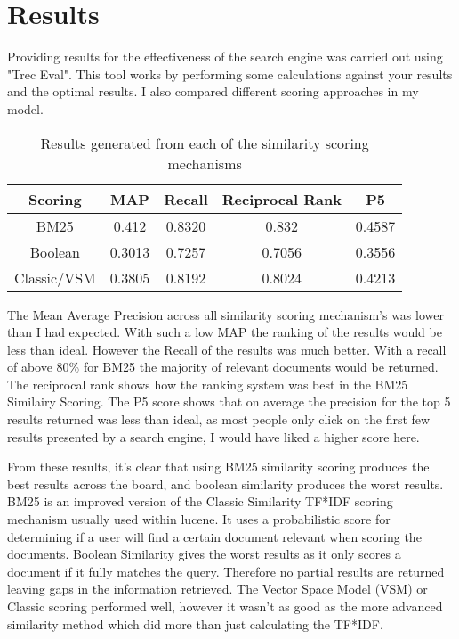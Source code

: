 \section{Results}
Providing results for the effectiveness of the search engine was carried out using "Trec Eval". This tool works by performing some calculations against your results and the optimal results. I also compared different scoring approaches in my model.\newline
\begin{table}[H]
\begin{tabular}{
|| c c c c c ||
}
\hline Scoring & MAP & Recall & Reciprocal Rank & P5 \\
\hline
BM25 & 0.412 & 0.8320 & 0.832 & 0.4587 \\
\hline\hline
Boolean & 0.3013 & 0.7257 & 0.7056 & 0.3556 \\
\hline
Classic/VSM & 0.3805 & 0.8192 & 0.8024 & 0.4213\\
\hline

\end{tabular}
\caption{Results generated from each of the similarity scoring mechanisms}
\end{table}
The Mean Average Precision across all similarity scoring mechanism's was lower than I had expected. With such a low MAP the ranking of the results would be less than ideal. However the Recall of the results was much better. With a recall of above 80\% for BM25 the majority of relevant documents would be returned. The reciprocal rank shows how the ranking system was best in the BM25 Similairy Scoring. The P5 score shows that on average the precision for the top 5 results returned was less than ideal, as most people only click on the first few results presented by a search engine, I would have liked a higher score here. \par
From these results, it's clear that using BM25 similarity scoring produces the best results across the board, and boolean similarity produces the worst results. BM25 is an improved version of the Classic Similarity TF*IDF scoring mechanism usually used within lucene. It uses a probabilistic score for determining if a user will find a certain document relevant when scoring the documents. Boolean Similarity gives the worst results as it only scores a document if it fully matches the query. Therefore no partial results are returned leaving gaps in the information retrieved. The Vector Space Model (VSM) or Classic scoring performed well, however it wasn't as good as the more advanced similarity method which did more than just calculating the TF*IDF.\par 

